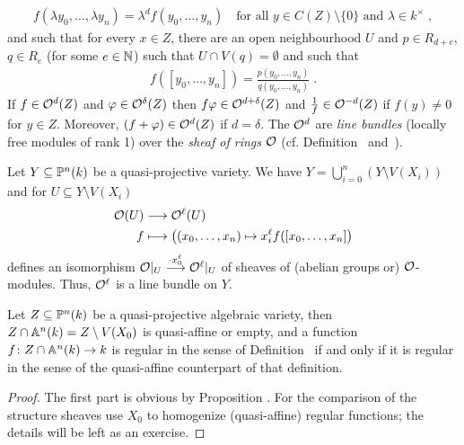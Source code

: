 \documentclass[a4paper,parskip=half,numbers=enddot, DIV=12]{scrreprt}
\begin{document}
\begin{rem*}
\begin{alphanumerate}
            \begin{align*}
                f(\lambda y_0,\ldots, \lambda y_n) = \lambda^d f(y_0,\ldots, y_n)\quad \text{for all }y\in C(Z)\setminus\{0\}\text{ and }\lambda \in k^\times\;, 
            \end{align*}
            and such that for every $x\in Z$, there are an open neighbourhood $U$ and $p\in R_{d+e}$, $q\in R_e$ (for some $e\in \mathbb{N}$) such that $U\cap V(q) = \emptyset$ and such that 
            \begin{align*}
            	f([y_0,\ldots, y_n]) = \frac{p(y_0,\ldots, y_n)}{q(y_0,\ldots, y_n)}\;. 
            \end{align*}
            If $f\in \mathcal{O}^d(Z)$ and $\varphi\in\mathcal{O}^\delta(Z)$ then $f\varphi \in \mathcal{O}^{d+\delta}(Z)$ and $\frac{1}{f}\in \mathcal{O}^{-d}(Z)$ if $f(y) \neq 0$ for $y\in Z$. Moreover, $(f+\varphi)\in \mathcal{O}^d(Z)$ if $d=\delta$. The $\mathcal{O}^d$ are \emph{line bundles} (locally free modules of rank 1) over the \emph{sheaf of rings} $\mathcal{O}$ (cf. Definition~ and~).
    \end{alphanumerate}
\end{rem*}
\begin{example}
    Let $Y\subseteq \mathbb{P}^n(k)$ be a quasi-projective variety. We have $Y = \bigcup_{i=0}^n (Y\setminus V(X_i))$ and for $U\subseteq Y\setminus V(X_i)$
    \begin{align*}
        \Oo(U) &\morphism \Oo^\ell(U)\\
        f&\longmapsto \big((x_0,\ldots, x_n) \mapsto x_i^\ell f([x_0,\ldots, x_n]\big)
    \end{align*}
    defines an isomorphism $\Oo|_U \morphism[\cdot x_0^\ell] \Oo^\ell|_U$ of sheaves of (abelian groups or) $\mathcal{O}$-modules. Thus, $\mathcal{O}^\ell$ is a line bundle on $Y$. 
\end{example}
\begin{prop}
    Let $Z\subseteq \mathbb{P}^n(k)$ be a quasi-projective algebraic variety, then $Z\cap \mathbb{A}^n(k) = Z \setminus V(X_0)$ is quasi-affine or empty, and a function $f\colon Z\cap \IA^n(k)\morphism k$ is regular in the sense of Definition~ if and only if it is regular in the sense of the quasi-affine counterpart of that definition. 
\end{prop}
\begin{proof}
    The first part is obvious by Proposition . For the comparison of the structure sheaves use $X_0$ to homogenize (quasi-affine) regular functions; the details will be left as an exercise.
\end{proof}
\end{document}
